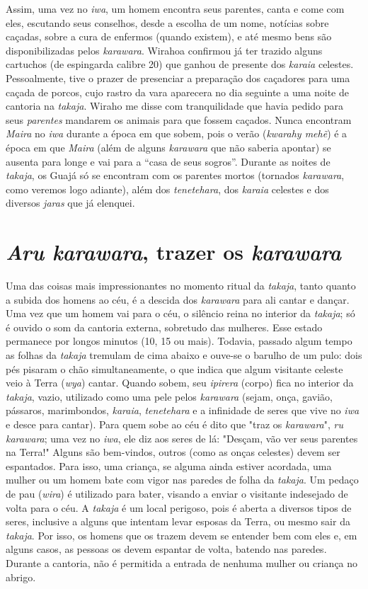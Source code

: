 Assim, uma vez no \emph{iwa}, um homem encontra seus parentes, canta e
come com eles, escutando seus conselhos, desde a escolha de um nome,
notícias sobre caçadas, sobre a cura de enfermos (quando existem), e até
mesmo bens são disponibilizadas pelos \emph{karawara}. Wirahoa confirmou
já ter trazido alguns cartuchos (de espingarda calibre 20) que ganhou de
presente dos \emph{karaia} celestes. Pessoalmente, tive o prazer de
presenciar a preparação dos caçadores para uma caçada de porcos, cujo
rastro da vara aparecera no dia seguinte a uma noite de cantoria na
\emph{takaja}. Wiraho me disse com tranquilidade que havia pedido para
seus \emph{parentes} mandarem os animais para que fossem caçados. Nunca
encontram \emph{Maira} no \emph{iwa} durante a época em que sobem, pois
o verão (\emph{kwarahy mehẽ}) é a época em que \emph{Maira} (além de
alguns \emph{karawara} que não saberia apontar) se ausenta para longe e
vai para a ``casa de seus sogros''. Durante as noites de \emph{takaja},
os Guajá só se encontram com os parentes mortos (tornados
\emph{karawara}, como veremos logo adiante), além dos \emph{tenetehara},
dos \emph{karaia} celestes e dos diversos \emph{jaras} que já elenquei.

\section{\emph{Aru karawara}, trazer os \emph{karawara}}\label{aru-karawara-trazer-os-karawara}

Uma das coisas mais impressionantes no momento ritual da \emph{takaja},
tanto quanto a subida dos homens ao céu, é a descida dos \emph{karawara}
para ali cantar e dançar. Uma vez que um homem vai para o céu, o
silêncio reina no interior da \emph{takaja}; só é ouvido o som da
cantoria externa, sobretudo das mulheres. Esse estado permanece por
longos minutos (10, 15 ou mais). Todavia, passado algum tempo as folhas
da \emph{takaja} tremulam de cima abaixo e ouve-se o barulho de um pulo:
dois pés pisaram o chão simultaneamente, o que indica que algum
visitante celeste veio à Terra (\emph{wya}) cantar. Quando sobem, seu
\emph{ipirera} (corpo) fica no interior da \emph{takaja}, vazio,
utilizado como uma pele pelos \emph{karawara} (sejam, onça, gavião,
pássaros, marimbondos, \emph{karaia}, \emph{tenetehara} e a infinidade
de seres que vive no \emph{iwa} e desce para cantar). Para quem sobe ao
céu é dito que "traz os \emph{karawara}", \emph{ru} \emph{karawara}; uma
vez no \emph{iwa}, ele diz aos seres de lá: "Desçam, vão ver seus
parentes na Terra!" Alguns são bem-vindos, outros (como as onças
celestes) devem ser espantados. Para isso, uma criança, se alguma ainda
estiver acordada, uma mulher ou um homem bate com vigor nas paredes de
folha da \emph{takaja}. Um pedaço de pau (\emph{wira}) é utilizado para
bater, visando a enviar o visitante indesejado de volta para o céu. A
\emph{takaja} é um local perigoso, pois é aberta a diversos tipos de
seres, inclusive a alguns que intentam levar esposas da Terra, ou mesmo
sair da \emph{takaja}. Por isso, os homens que os trazem devem se
entender bem com eles e, em alguns casos, as pessoas os devem espantar
de volta, batendo nas paredes. Durante a cantoria, não é permitida a
entrada de nenhuma mulher ou criança no abrigo.

